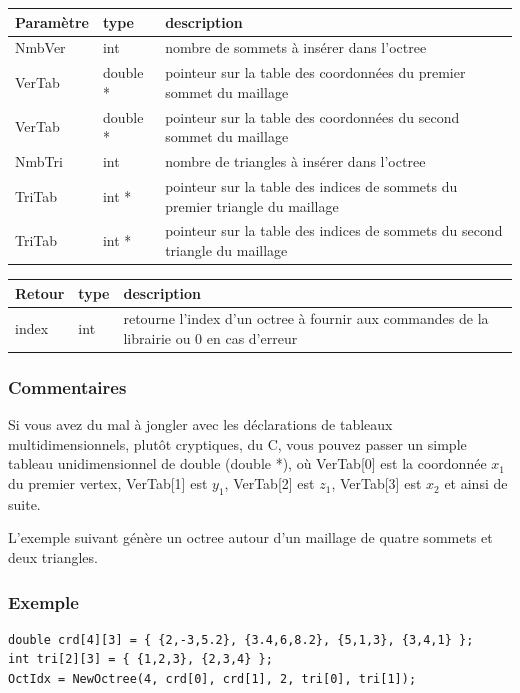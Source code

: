 \documentclass[a4paper,12pt]{article}
\begin{document}
\begin{tabular}{|m{2cm}|m{2cm}|m{10cm}|}
\hline
Paramètre  & type     & description \\
\hline
NmbVer     & int      & nombre de sommets à insérer dans l'octree \\
\hline
VerTab     & double * & pointeur sur la table des coordonnées du premier sommet du maillage \\
\hline
VerTab     & double * & pointeur sur la table des coordonnées du second sommet du maillage \\
\hline
NmbTri     & int      & nombre de triangles à insérer dans l'octree  \\
\hline
TriTab     & int *    & pointeur sur la table des indices de sommets du premier triangle du maillage \\
\hline
TriTab     & int *    & pointeur sur la table des indices de sommets du second triangle du maillage \\
\hline
\end{tabular}

\medskip

\begin{tabular}{|m{2cm}|m{2cm}|m{10cm}|}
\hline
Retour     & type   & description \\
\hline
index      & int    & retourne l'index d'un octree à fournir aux commandes de la librairie ou 0 en cas d'erreur \\
\hline
\end{tabular}
\subsubsection*{Commentaires}
Si vous avez du mal à jongler avec les déclarations de tableaux multidimensionnels, plutôt cryptiques, du C, vous pouvez passer un simple tableau unidimensionnel de double (double *), où VerTab[0] est la coordonnée $x_1$ du premier vertex, VerTab[1] est $y_1$, VerTab[2] est $z_1$, VerTab[3] est $x_2$ et ainsi de suite.

L'exemple suivant génère un octree autour d'un maillage de quatre sommets et deux triangles.

\subsubsection*{Exemple}

\begin{tt}
\begin{verbatim}
double crd[4][3] = { {2,-3,5.2}, {3.4,6,8.2}, {5,1,3}, {3,4,1} };
int tri[2][3] = { {1,2,3}, {2,3,4} };
OctIdx = NewOctree(4, crd[0], crd[1], 2, tri[0], tri[1]);
\end{verbatim}
\end{tt}
\normalfont
\end{document}
